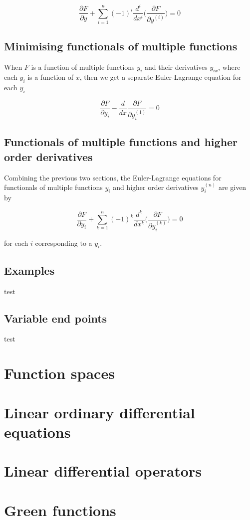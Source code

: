 \documentclass[]{article}
\begin{document}
\begin{equation} \frac{\partial F}{\partial y} + \sum_{i=1}^{n} (-1)^{i}\frac{d^{i}}{dx^{i}} \bigg(\frac{\partial F}{\partial y^{(i)}}\bigg) = 0 \end{equation}  

\subsection{Minimising functionals of multiple functions}
When $F$ is a function of multiple functions $y_{i}$ and their derivatives $y_{ix}$, where each $y_{i}$ is a function of $x$, then we get a separate Euler-Lagrange equation for each $y_{i}$

\begin{equation} \frac{\partial F}{\partial y_{i}} - \frac{d}{dx}\frac{\partial F}{\partial y_{i}^{(1)}} = 0 \end{equation}

\subsection{Functionals of multiple functions and higher order derivatives}
Combining the previous two sections, the Euler-Lagrange equations for functionals of multiple functions $y_{i}$ and higher order derivatives $y_{i}^{(n)}$ are given by

\begin{equation} \frac{\partial F}{\partial y_{i}} + \sum_{k=1}^{n} (-1)^{k}\frac{d^{k}}{dx^{k}} \bigg(\frac{\partial F}{\partial y^{(k)}_{i}}\bigg) = 0 \end{equation}  

for each $i$ corresponding to a $y_{i}$.

\subsection{Examples}
test
\subsection{Variable end points}
test





\section{Function spaces}

\section{Linear ordinary differential equations}

\section{Linear differential operators}

\section{Green functions}
\end{document}
